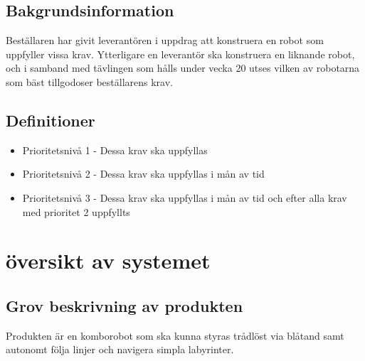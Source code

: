 \documentclass[a4paper,12pt]{article}
\begin{document}
\subsection{Bakgrundsinformation}
Beställaren har givit leverantören i uppdrag att konstruera en robot som uppfyller vissa krav.
Ytterligare en leverantör ska konstruera en liknande robot,
och i samband med tävlingen som hålls under vecka 20 utses vilken av robotarna som bäst tillgodoser beställarens krav.

\subsection{Definitioner} \label{DEF}
\begin{itemize}
\item Prioritetsnivå 1 - Dessa krav ska uppfyllas
\item Prioritetsnivå 2 - Dessa krav ska uppfyllas i mån av tid
\item Prioritetsnivå 3 - Dessa krav ska uppfyllas i mån av tid och efter alla krav med prioritet 2 uppfyllts
\end{itemize}

\section{översikt av systemet}

\subsection{Grov beskrivning av produkten}
Produkten är en komborobot som ska kunna styras trådlöst via blåtand samt autonomt följa linjer och navigera simpla labyrinter.
\end{document}
